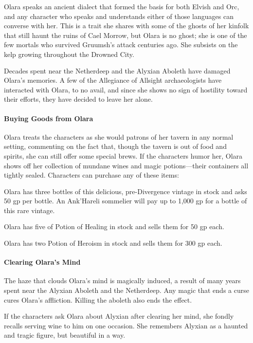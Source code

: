 \documentclass[10pt,a4paper,twoside,twocolumn,openany,nodeprecatedcode]{dndbook}
\begin{document}
Olara speaks an ancient dialect that formed the basis for both Elvish and Orc, and any character who speaks and understands either of those languages can converse with her. This is a trait she shares with some of the ghosts of her kinfolk that still haunt the ruins of Cael Morrow, but Olara is no ghost; she is one of the few mortals who survived Gruumsh's attack centuries ago. She subsists on the kelp growing throughout the Drowned City.

Decades spent near the Netherdeep and the Alyxian Aboleth have damaged Olara's memories. A few of the Allegiance of Allsight archaeologists have interacted with Olara, to no avail, and since she shows no sign of hostility toward their efforts, they have decided to leave her alone.

\paragraph{Buying Goods from Olara}
Olara treats the characters as she would patrons of her tavern in any normal setting, commenting on the fact that, though the tavern is out of food and spirits, she can still offer some special brews. If the characters humor her, Olara shows off her collection of mundane wines and magic potions—their containers all tightly sealed. Characters can purchase any of these items:


\begin{description}[nolistsep]
\item[Magically Preserved Wine.]
Olara has three bottles of this delicious, pre-Divergence vintage in stock and asks 50 gp per bottle. An Ank'Hareli sommelier will pay up to 1,000 gp for a bottle of this rare vintage.
\item[Potions of Healing.]
Olara has five of Potion of Healing in stock and sells them for 50 gp each.
\item[Potions of Heroism.]
Olara has two Potion of Heroism in stock and sells them for 300 gp each.
\end{description}

\paragraph{Clearing Olara's Mind}
The haze that clouds Olara's mind is magically induced, a result of many years spent near the Alyxian Aboleth and the Netherdeep. Any magic that ends a curse cures Olara's affliction. Killing the aboleth also ends the effect.

If the characters ask Olara about Alyxian after clearing her mind, she fondly recalls serving wine to him on one occasion. She remembers Alyxian as a haunted and tragic figure, but beautiful in a way.
\end{document}
